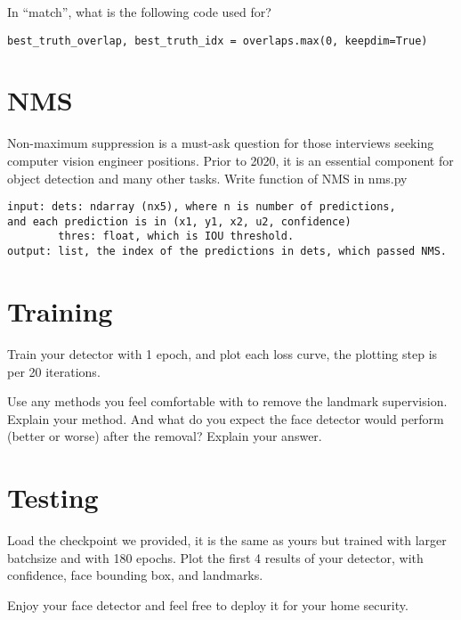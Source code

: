\documentclass[11pt,addpoints,answers]{exam}
\begin{document}
In “match”, what is the following code used for?

\begin{verbatim}
best_truth_overlap, best_truth_idx = overlaps.max(0, keepdim=True)
\end{verbatim}
\begin{solution*}{}

\end{solution*}


\section{NMS}
Non-maximum suppression is a must-ask question for those interviews seeking computer vision engineer positions. Prior to 2020, it is an essential component for object detection and many other
tasks. Write function of NMS in nms.py

\begin{verbatim}
input: dets: ndarray (nx5), where n is number of predictions, 
and each prediction is in (x1, y1, x2, u2, confidence)
        thres: float, which is IOU threshold.
output: list, the index of the predictions in dets, which passed NMS. 
\end{verbatim}


\section{Training}
Train your detector with 1 epoch, and plot each loss curve, the plotting step is per 20 iterations.

\begin{solution*}{}

\end{solution*}

Use any methods you feel comfortable with to remove the landmark supervision. Explain your method.  And what do you expect the face detector would perform (better or worse) after the removal? Explain your answer.
\begin{solution*}{}

\end{solution*}

\section{Testing}
Load the checkpoint we provided, it is the same as yours but trained with larger batchsize and with 180 epochs. Plot the first 4 results of your detector, with confidence,
face bounding box, and landmarks.

\begin{solution*}{}

\end{solution*}


Enjoy your face detector and feel free to deploy it for your home security.
\end{document}
